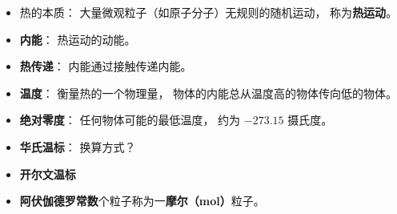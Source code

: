 
\begin{issues}
\issueDraft
\end{issues}

\begin{itemize}
\item 热的本质： 大量微观粒子（如原子分子）无规则的随机运动， 称为\textbf{热运动}。
\item \textbf{内能}： 热运动的动能。
\item \textbf{热传递}： 内能通过接触传递内能。
\item \textbf{温度}： 衡量热的一个物理量， 物体的内能总从温度高的物体传向低的物体。
\item \textbf{绝对零度}： 任何物体可能的最低温度， 约为 $-273.15$ 摄氏度。
\item \textbf{华氏温标}： 换算方式？
\item \textbf{开尔文温标}
\item \textbf{阿伏伽德罗常数}个粒子称为一\textbf{摩尔（mol）}粒子。
\end{itemize}
